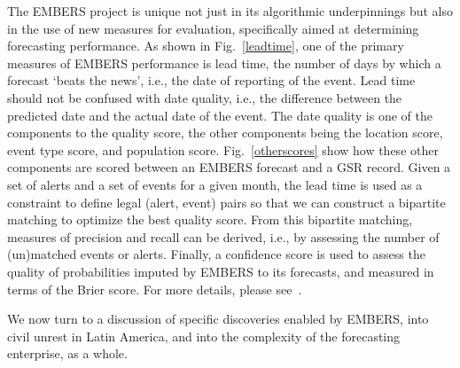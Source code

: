 The EMBERS project is unique not just in its algorithmic underpinnings but also in the use of new measures
for evaluation, specifically aimed at determining forecasting performance. As shown in Fig.~\ref{leadtime},
one of the primary measures of EMBERS performance is lead time, the number of days by which a forecast
`beats the news', i.e., the date of reporting of the event. Lead time should not be confused with 
date quality, i.e., the difference between the predicted date and the actual date of the event. The date
quality is one of the components to the quality score, the other components being the
location score, event type score, and population score. Fig.~\ref{otherscores} show how these other
components are scored between an EMBERS forecast and a GSR record. Given a set of alerts and a set of
events for a given month, the lead time is used as a constraint to define legal (alert, event) pairs so that
we can construct a bipartite matching to optimize the best quality score. From this bipartite matching,
measures of precision and recall can be derived, i.e., by assessing the number of (un)matched events or
alerts. Finally, a confidence score is used to assess the quality of probabilities imputed by EMBERS to its
forecasts, and measured in terms of the Brier score. For more details, please see~\cite{beating-embers-kdd}. 

We now turn to a discussion of specific discoveries enabled by EMBERS, into civil unrest in Latin America, and into
the complexity of the forecasting enterprise, as a whole.

